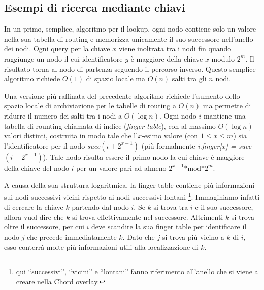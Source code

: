 \subsection{Esempi di ricerca mediante chiavi}\label{esempi-di-ricerca-mediante-chiavi}

In un primo, semplice, algoritmo per il lookup, ogni nodo contiene solo un valore nella sua tabella di routing e memorizza unicamente il suo successore nell'anello dei nodi. Ogni query per la chiave $x$ viene inoltrata tra i nodi fin quando raggiunge un nodo il cui identificatore $y$ è maggiore della chiave $x$ modulo $2^m$. Il risultato torna al nodo di partenza seguendo il percorso inverso. Questo semplice algoritmo richiede $O(1)$ di spazio locale ma $O(n)$ salti tra gli $n$ nodi.


Una versione più raffinata del precedente algoritmo richiede l'aumento dello spazio locale di archiviazione per le tabelle di routing a $O(n)$ ma permette di ridurre il numero dei salti tra i nodi a $O(\log n)$. Ogni nodo $i$ mantiene una tabella di rounting chiamata di indice (\emph{finger table}), con al massimo $O(\log n)$ valori distinti, costruita in modo tale che l'$x$-esimo valore (con $1 \leq x \leq m$) sia l'identificatore per il nodo \emph{succ}$(i + 2^{x-1})$ (più formalmente \emph{i.finger{[}$x${]} = succ}$(i + 2^{x-1})$). Tale nodo risulta essere il primo nodo la cui chiave è maggiore della chiave del nodo $i$ per un valore pari ad almeno $2^{x-1}\text{*mod*}2^m$.

A causa della sua struttura logaritmica, la finger table contiene più informazioni sui nodi successivi vicini rispetto ai nodi successivi lontani \footnote{qui ``successivi'', ``vicini'' e ``lontani'' fanno   riferimento all'anello che si viene a creare nella Chord overlay.}. Immaginiamo infatti di cercare la chiave $k$ partendo dal nodo $i$. Se $k$ si trova tra $i$ e il suo successore, allora vuol dire che $k$ si trova effettivamente nel successore. Altrimenti $k$ si trova oltre il successore, per cui $i$ deve scandire la sua finger table per identificare il nodo $j$ che precede immediatamente $k$. Dato che $j$ si trova più vicino a $k$ di $i$, esso conterrà molte più informazioni utili alla localizzazione di $k$.

